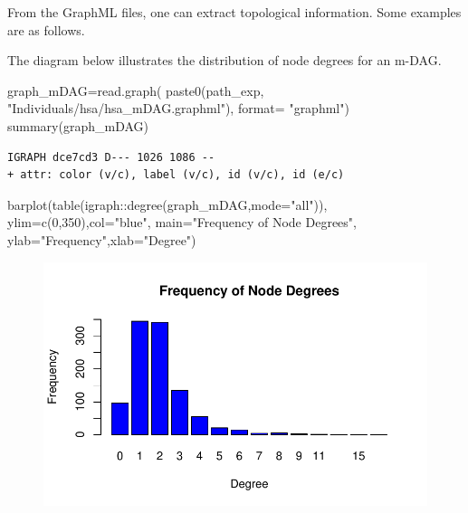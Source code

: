 \documentclass[
  letterpaper,
  DIV=11,
  numbers=noendperiod]{scrreprt}
\newenvironment{Shaded}{}{}
\newcommand{\AttributeTok}[1]{\textcolor[rgb]{0.78,0.47,0.87}{#1}}
\newcommand{\DecValTok}[1]{\textcolor[rgb]{0.82,0.60,0.40}{#1}}
\newcommand{\FunctionTok}[1]{\textcolor[rgb]{0.38,0.69,0.94}{#1}}
\newcommand{\NormalTok}[1]{\textcolor[rgb]{0.67,0.70,0.75}{#1}}
\newcommand{\OtherTok}[1]{\textcolor[rgb]{0.15,0.68,0.38}{#1}}
\newcommand{\SpecialCharTok}[1]{\textcolor[rgb]{0.34,0.71,0.76}{#1}}
\newcommand{\StringTok}[1]{\textcolor[rgb]{0.60,0.76,0.47}{#1}}
\begin{document}
From the GraphML files, one can extract topological information. Some
examples are as follows.

The diagram below illustrates the distribution of node degrees for an
m-DAG.

\begin{Shaded}
\begin{Highlighting}[]
\NormalTok{graph\_mDAG}\OtherTok{=}\FunctionTok{read.graph}\NormalTok{(}
  \FunctionTok{paste0}\NormalTok{(path\_exp,}
         \StringTok{"Individuals/hsa/hsa\_mDAG.graphml"}\NormalTok{),}
  \AttributeTok{format=} \StringTok{"graphml"}\NormalTok{)}
\FunctionTok{summary}\NormalTok{(graph\_mDAG)}
\end{Highlighting}
\end{Shaded}

\begin{verbatim}
IGRAPH dce7cd3 D--- 1026 1086 -- 
+ attr: color (v/c), label (v/c), id (v/c), id (e/c)
\end{verbatim}

\begin{Shaded}
\begin{Highlighting}[]
\FunctionTok{barplot}\NormalTok{(}\FunctionTok{table}\NormalTok{(igraph}\SpecialCharTok{::}\FunctionTok{degree}\NormalTok{(graph\_mDAG,}\AttributeTok{mode=}\StringTok{"all"}\NormalTok{)),}
              \AttributeTok{ylim=}\FunctionTok{c}\NormalTok{(}\DecValTok{0}\NormalTok{,}\DecValTok{350}\NormalTok{),}\AttributeTok{col=}\StringTok{"blue"}\NormalTok{,}
              \AttributeTok{main=}\StringTok{"Frequency of Node Degrees"}\NormalTok{,}
              \AttributeTok{ylab=}\StringTok{"Frequency"}\NormalTok{,}\AttributeTok{xlab=}\StringTok{"Degree"}\NormalTok{)}
\end{Highlighting}
\end{Shaded}

\begin{figure}[H]

{\centering \includegraphics[width=1\textwidth,height=\textheight]{index_files/figure-pdf/unnamed-chunk-19-1.pdf}

}

\end{figure}
\end{document}
